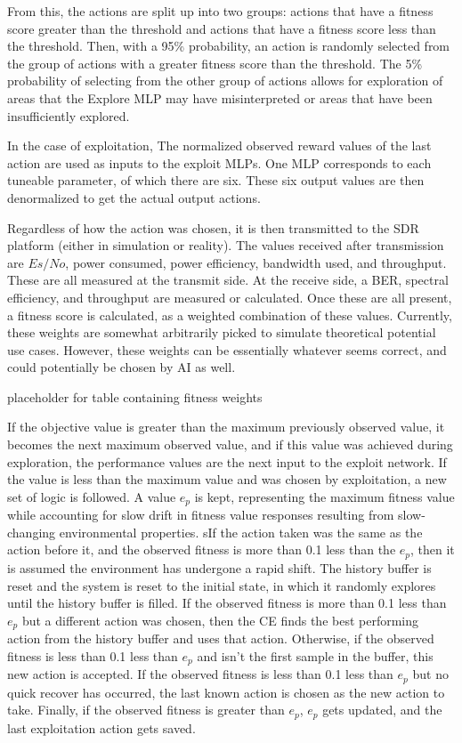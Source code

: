 \par  From this, the actions are split up into two groups: actions that have a fitness score greater than the threshold and actions that have a fitness score less than the threshold. Then, with a 95\% probability, an action is randomly selected from the group of actions with a greater fitness score than the threshold. The 5\% probability of selecting from the other group of actions allows for exploration of areas that the Explore MLP may have misinterpreted or areas that have been insufficiently explored.
\par In the case of exploitation, The normalized observed reward values of the last action are used as inputs to the exploit MLPs. One MLP corresponds to each tuneable parameter, of which there are six. These six output values are then denormalized to get the actual output actions.
\par Regardless of how the action was chosen, it is then transmitted to the SDR platform (either in simulation or reality). The values received after transmission are $Es/No$, power consumed, power efficiency, bandwidth used, and throughput. These are all measured at the transmit side. At the receive side, a BER, spectral efficiency, and throughput are measured or calculated. Once these are all present, a fitness score is calculated, as a weighted combination of these values. Currently, these weights are somewhat arbitrarily picked to simulate theoretical potential use cases. However, these weights can be essentially whatever seems correct, and could potentially be chosen by AI as well. 
\begin{table}
\caption{placeholder for table containing fitness weights}
\end{table}
\par If the objective value is greater than the maximum previously observed value, it becomes the next maximum observed value, and if this value was achieved during exploration, the performance values are the next input to the exploit network. If the value is less than the maximum value and was chosen by exploitation, a new set of logic is followed. A value $e_p$ is kept, representing the maximum fitness value while accounting for slow drift in fitness value responses resulting from slow-changing environmental properties. sIf the action taken was the same as the action before it, and the observed fitness is more than 0.1 less than the $e_p$, then it is assumed the environment has undergone a rapid shift. The history buffer is reset and the system is reset to the initial state, in which it randomly explores until the history buffer is filled.  If the observed fitness is more than 0.1 less than $e_p$ but a different action was chosen, then the CE finds the best performing action from the history buffer and uses that action. Otherwise, if the observed fitness is less than 0.1 less than $e_p$ and isn't the first sample in the buffer, this new action is accepted. If the observed fitness is less than 0.1 less than $e_p$ but no quick recover has occurred, the last known action is chosen as the new action to take. Finally, if the observed fitness is greater than $e_p$, $e_p$ gets updated, and the last exploitation action gets saved. 


